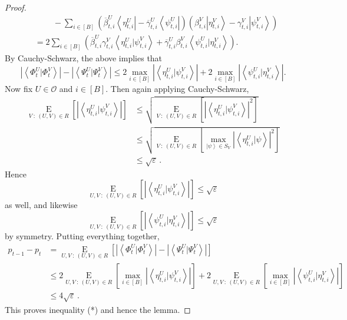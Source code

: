 \begin{proof}
\begin{align*}
&  ~~~~~~~~~~-\sum_{i\in\left[  B\right]  }\left(  \overline{\beta}_{t,i}%
^{U}\left\langle \eta_{t,i}^{U}\right\vert -\overline{\gamma}_{t,i}%
^{U}\left\langle \psi_{t,i}^{U}\right\vert \right)  \left(  \beta_{t,i}%
^{V}\left\vert \eta_{t,i}^{V}\right\rangle -\gamma_{t,i}^{V}\left\vert
\psi_{t,i}^{V}\right\rangle \right) \\
&  =2\sum_{i\in\left[  B\right]  }\left(  \overline{\beta}_{t,i}^{U}%
\gamma_{t,i}^{V}\left\langle \eta_{t,i}^{U}|\psi_{t,i}^{V}\right\rangle
+\overline{\gamma}_{t,i}^{U}\beta_{t,i}^{V}\left\langle \psi_{t,i}^{U}%
|\eta_{t,i}^{V}\right\rangle \right)  .
\end{align*}
By Cauchy-Schwarz, the above implies that%
\[
\left\vert \left\langle \Phi_{t}^{U}|\Phi_{t}^{V}\right\rangle \right\vert
-\left\vert \left\langle \Psi_{t}^{U}|\Psi_{t}^{V}\right\rangle \right\vert
\leq2\max_{i\in\left[  B\right]  }\left\vert \left\langle \eta_{t,i}^{U}%
|\psi_{t,i}^{V}\right\rangle \right\vert +2\max_{i\in\left[  B\right]
}\left\vert \left\langle \psi_{t,i}^{U}|\eta_{t,i}^{V}\right\rangle
\right\vert .
\]
Now fix $U\in\mathcal{O}$ and $i\in\left[  B\right]  $. Then again applying
Cauchy-Schwarz,%
\begin{align*}
\operatorname*{E}_{V~:~\left(  U,V\right)  \in R}\left[  \left\vert
\left\langle \eta_{t,i}^{U}|\psi_{t,i}^{V}\right\rangle \right\vert \right]
&  \leq\sqrt{\operatorname*{E}_{V~:~\left(  U,V\right)  \in R}\left[
\left\vert \left\langle \eta_{t,i}^{U}|\psi_{t,i}^{V}\right\rangle \right\vert
^{2}\right]  }\\
&  \leq\sqrt{\operatorname*{E}_{V~:~\left(  U,V\right)  \in R}\left[
\max_{\left\vert \psi\right\rangle \in S_{V}}\left\vert \left\langle
\eta_{t,i}^{U}|\psi\right\rangle \right\vert ^{2}\right]  }\\
&  \leq\sqrt{\varepsilon}\,.
\end{align*}
Hence%
\[
\operatorname*{E}_{U,V~:~\left(  U,V\right)  \in R}\left[  \left\vert
\left\langle \eta_{t,i}^{U}|\psi_{t,i}^{V}\right\rangle \right\vert \right]
\leq\sqrt{\varepsilon}%
\]
as well, and likewise%
\[
\operatorname*{E}_{U,V~:~\left(  U,V\right)  \in R}\left[  \left\vert
\left\langle \psi_{t,i}^{U}|\eta_{t,i}^{V}\right\rangle \right\vert \right]
\leq\sqrt{\varepsilon}%
\]
by symmetry. Putting everything together,%
\begin{align*}
p_{t-1}-p_{t}  &  =\operatorname*{E}_{U,V~:~\left(  U,V\right)  \in R}\left[
\left\vert \left\langle \Phi_{t}^{U}|\Phi_{t}^{V}\right\rangle \right\vert
-\left\vert \left\langle \Psi_{t}^{U}|\Psi_{t}^{V}\right\rangle \right\vert
\right] \\
&  \leq2\operatorname*{E}_{U,V~:~\left(  U,V\right)  \in R}\left[  \max
_{i\in\left[  B\right]  }\left\vert \left\langle \eta_{t,i}^{U}|\psi_{t,i}%
^{V}\right\rangle \right\vert \right]  +2\operatorname*{E}_{U,V~:~\left(
U,V\right)  \in R}\left[  \max_{i\in\left[  B\right]  }\left\vert \left\langle
\psi_{t,i}^{U}|\eta_{t,i}^{V}\right\rangle \right\vert \right] \\
&  \leq4\sqrt{\varepsilon}\,.
\end{align*}
This proves inequality (*) and hence the lemma.
\end{proof}

